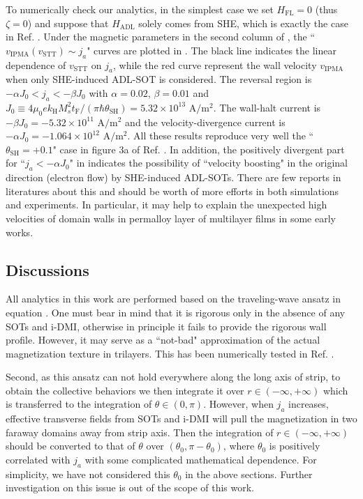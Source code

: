 \documentclass[12pt]{iopart}
\begin{document}
To numerically check our analytics, in the simplest case we set
$H_{\mathrm{FL}}=0$ (thus $\zeta=0$) and suppose that $H_{\mathrm{ADL}}$ 
solely comes from SHE, which is exactly the case in Ref. \cite{Seo_APL_2012}.
Under the magnetic parameters in the second column of ,
the ``$v_{\mathrm{IPMA}}(v_{\mathrm{STT}})\sim j_a$" curves are plotted in .
The black line indicates the linear dependence of $v_{\mathrm{STT}}$ on $j_a$,
while the red curve represent the wall velocity $v_{\mathrm{IPMA}}$ when only SHE-induced ADL-SOT is considered.
The reversal region is $-\alpha J_0<j_a<-\beta J_0$ with $\alpha=0.02$, $\beta=0.01$
and $J_0\equiv 4\mu_{0} e k_{\mathrm{H}} M_s^2 t_{\mathrm{F}}/(\pi\hbar\theta_{\mathrm{SH}})=5.32\times 10^{13}$ $\mathrm{A/m^2}$.
The wall-halt current is $-\beta J_0=-5.32\times 10^{11}$ $\mathrm{A/m^2}$
and the velocity-divergence current is $-\alpha J_0=-1.064\times 10^{12}$ $\mathrm{A/m^2}$.
All these results reproduce very well the ``$\theta_{\mathrm{SH}}=+0.1$" case in figure 3a of Ref. \cite{Seo_APL_2012}.
In addition, the positively divergent part for ``$j_a<-\alpha J_0$" in 
indicates the possibility of ``velocity boosting" in the original direction (electron flow) 
by SHE-induced ADL-SOTs.
There are few reports in literatures about this and
should be worth of more efforts in both simulations and experiments.
In particular, it may help to explain the unexpected high
velocities of domain walls in permalloy layer of multilayer films in some early works\cite{Hayashi_PRL_2007}.

\subsection{Discussions}
All analytics in this work are performed based on the
traveling-wave ansatz in equation .
One must bear in mind that it is rigorous only in the
absence of any SOTs and i-DMI, otherwise in principle it fails to provide the rigorous
wall profile. However, it may serve as a ``not-bad" approximation of the actual
magnetization texture in trilayers.
This has been numerically tested in Ref. \cite{Risinggad_PRB_2017}.

Second, as this ansatz can not hold everywhere
along the long axis of strip, to obtain the collective behaviors we then integrate
it over $r\in(-\infty,+\infty)$ which is transferred to the integration
of $\theta\in(0,\pi)$. However, when $j_a$ increases, effective
transverse fields from SOTs and i-DMI will pull the magnetization in two
faraway domains away from strip axis. Then the integration of
$r\in(-\infty,+\infty)$ should be converted to
that of $\theta$ over $(\theta_0,\pi-\theta_0)$, where
$\theta_0$ is positively correlated with $j_a$ with some complicated mathematical dependence.
For simplicity, we have not considered this $\theta_0$ in the above sections.
Further investigation on this issue is out of the scope of this work.
\end{document}
